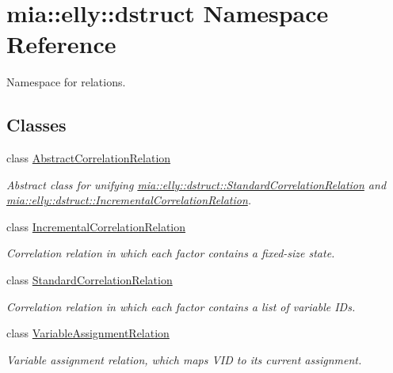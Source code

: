 \hypertarget{namespacemia_1_1elly_1_1dstruct}{\section{mia\-:\-:elly\-:\-:dstruct Namespace Reference}
\label{namespacemia_1_1elly_1_1dstruct}
}


Namespace for relations.  


\subsection*{Classes}
\begin{DoxyCompactItemize}
\item 
class \hyperlink{classmia_1_1elly_1_1dstruct_1_1_abstract_correlation_relation}{Abstract\-Correlation\-Relation}
\begin{DoxyCompactList}\small\item\em Abstract class for unifying \hyperlink{classmia_1_1elly_1_1dstruct_1_1_standard_correlation_relation}{mia\-::elly\-::dstruct\-::\-Standard\-Correlation\-Relation} and \hyperlink{classmia_1_1elly_1_1dstruct_1_1_incremental_correlation_relation}{mia\-::elly\-::dstruct\-::\-Incremental\-Correlation\-Relation}. \end{DoxyCompactList}\item 
class \hyperlink{classmia_1_1elly_1_1dstruct_1_1_incremental_correlation_relation}{Incremental\-Correlation\-Relation}
\begin{DoxyCompactList}\small\item\em Correlation relation in which each factor contains a fixed-\/size state. \end{DoxyCompactList}\item 
class \hyperlink{classmia_1_1elly_1_1dstruct_1_1_standard_correlation_relation}{Standard\-Correlation\-Relation}
\begin{DoxyCompactList}\small\item\em Correlation relation in which each factor contains a list of variable I\-Ds. \end{DoxyCompactList}\item 
class \hyperlink{classmia_1_1elly_1_1dstruct_1_1_variable_assignment_relation}{Variable\-Assignment\-Relation}
\begin{DoxyCompactList}\small\item\em Variable assignment relation, which maps V\-I\-D to its current assignment. \end{DoxyCompactList}\item 

\end{DoxyCompactItemize}
